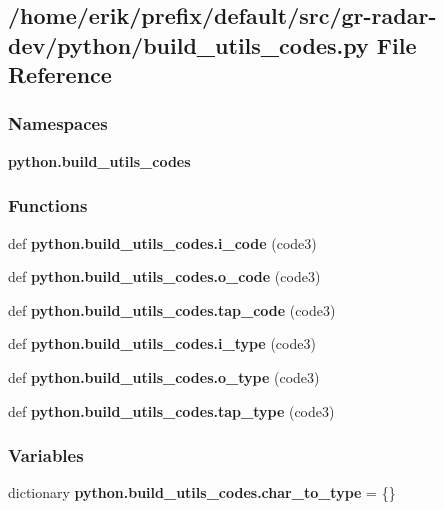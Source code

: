 \subsection{/home/erik/prefix/default/src/gr-\/radar-\/dev/python/build\+\_\+utils\+\_\+codes.py File Reference}
\label{build__utils__codes_8py}
\subsubsection*{Namespaces}
\begin{DoxyCompactItemize}
\item 
 {\bf python.\+build\+\_\+utils\+\_\+codes}
\end{DoxyCompactItemize}
\subsubsection*{Functions}
\begin{DoxyCompactItemize}
\item 
def {\bf python.\+build\+\_\+utils\+\_\+codes.\+i\+\_\+code} (code3)
\item 
def {\bf python.\+build\+\_\+utils\+\_\+codes.\+o\+\_\+code} (code3)
\item 
def {\bf python.\+build\+\_\+utils\+\_\+codes.\+tap\+\_\+code} (code3)
\item 
def {\bf python.\+build\+\_\+utils\+\_\+codes.\+i\+\_\+type} (code3)
\item 
def {\bf python.\+build\+\_\+utils\+\_\+codes.\+o\+\_\+type} (code3)
\item 
def {\bf python.\+build\+\_\+utils\+\_\+codes.\+tap\+\_\+type} (code3)
\end{DoxyCompactItemize}
\subsubsection*{Variables}
\begin{DoxyCompactItemize}
\item 
dictionary {\bf python.\+build\+\_\+utils\+\_\+codes.\+char\+\_\+to\+\_\+type} = \{\}
\end{DoxyCompactItemize}
